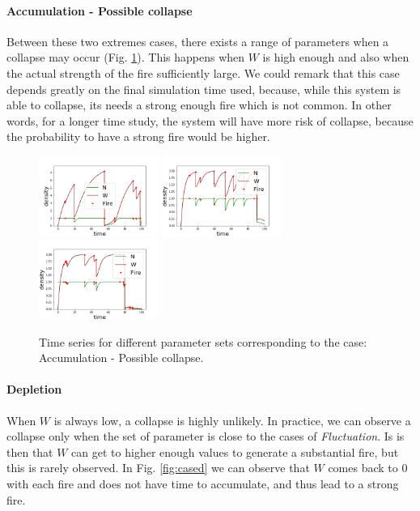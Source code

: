 \documentclass{article}
\begin{document}
\paragraph{Accumulation - Possible collapse \\} %
Between these two extremes cases, there exists a range of parameters when a collapse may occur (Fig. \ref{fig:caseapc}). This happens when $W$ is high enough and also when the actual strength of the fire sufficiently large. We could remark that this case depends greatly on the final simulation time used, because, while this system is able to collapse, its needs a strong enough fire which is not common. In other words, for a longer time study, the system will have more risk of collapse, because the probability to have a strong fire would be higher.

\begin{figure}[h!]
\centering
\includegraphics[width=3.9cm]{return_between_1.png}
\includegraphics[width=3.9cm]{return_between_2.png}
\includegraphics[width=3.9cm]{return_between_3.png}
\caption{Time series for different parameter sets corresponding to the case: Accumulation - Possible collapse.}
\label{fig:caseapc}
\end{figure}


\paragraph{Depletion \\}
When $W$ is always low, a collapse is highly unlikely. In practice, we can observe a collapse only when the set of parameter is close to the cases of \textit{Fluctuation}. Is is then that $W$ can get to higher enough values to generate a substantial fire, but this is rarely observed. In Fig. \ref{fig:cased} we can observe that $W$ comes back to $0$ with each fire and does not have time to accumulate, and thus lead to a strong fire.
\end{document}
